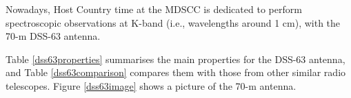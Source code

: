 Nowadays, Host Country time at the MDSCC is dedicated to perform
spectroscopic observations at K-band (i.e., wavelengths around 1 cm),
with the 70-m DSS-63 antenna.

Table \ref{dss63properties} summarises the main properties for the
DSS-63 antenna, and Table \ref{dss63comparison} compares them with
those from other similar radio telescopes. Figure \ref{dss63image}
shows a picture of the 70-m antenna.

